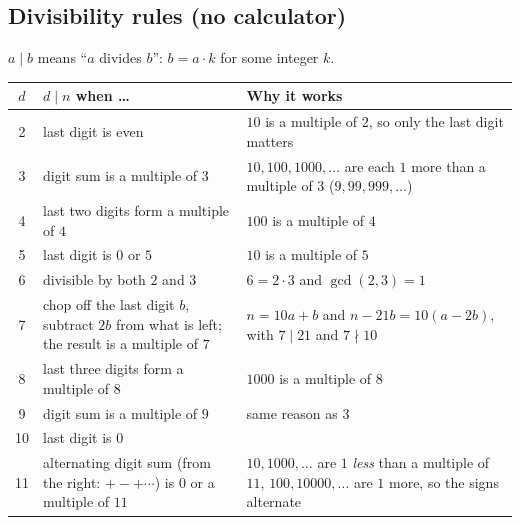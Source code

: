 \documentclass{fkt-notes}
\theoremstyle{definition}
\begin{document}
\subsection{Divisibility rules (no calculator)}
$a \mid b$ means ``$a$ divides $b$'': $b = a \cdot k$ for some integer $k$.

\begin{rulepar}
  \begin{center}
    \renewcommand{\arraystretch}{1.25}
    \begin{tabular}{@{}c p{5.2cm} p{6.4cm}@{}}
      \toprule
      $d$ & $d \mid n$ when \ldots                                           & Why it works \\
      \midrule
      2   & last digit is even
          & $10$ is a multiple of $2$, so only the last digit matters                       \\
      3   & digit sum is a multiple of $3$
          & $10, 100, 1000, \ldots$ are each $1$ more than a multiple of $3$
      ($9, 99, 999, \ldots$)                                                                \\
      4   & last two digits form a multiple of $4$
          & $100$ is a multiple of $4$                                                      \\
      5   & last digit is $0$ or $5$
          & $10$ is a multiple of $5$                                                       \\
      6   & divisible by both $2$ and $3$
          & $6 = 2 \cdot 3$ and $\gcd(2,3) = 1$                                             \\
      7   & chop off the last digit $b$, subtract $2b$ from what is left;
      the result is a multiple of $7$
          & $n = 10a + b$ and $n - 21b = 10(a - 2b)$, with $7 \mid 21$ and
      $7 \nmid 10$                                                                          \\
      8   & last three digits form a multiple of $8$
          & $1000$ is a multiple of $8$                                                     \\
      9   & digit sum is a multiple of $9$
          & same reason as $3$                                                              \\
      10  & last digit is $0$
          &                                                                                 \\
      11  & alternating digit sum (from the right: $+ - + \cdots$) is
      $0$ or a multiple of $11$
          & $10, 1000, \ldots$ are $1$ \emph{less} than a multiple of $11$,
      $100, 10000, \ldots$ are $1$ more, so the signs alternate                             \\
      \bottomrule
    \end{tabular}
  \end{center}


\end{rulepar}
\end{document}
